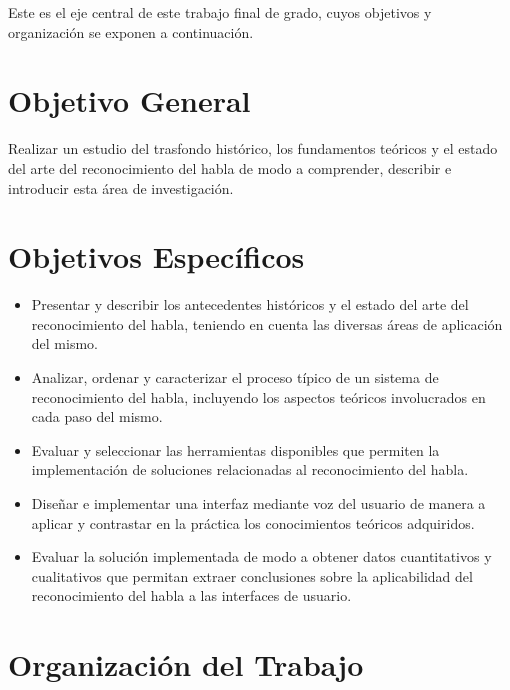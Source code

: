 Este es el eje central de este trabajo final de grado, cuyos objetivos y organizaci\'on se
exponen a continuaci\'on.

\section{Objetivo General}
\label{sec:objgral}

Realizar un estudio del trasfondo hist\'{o}rico, los fundamentos te\'{o}ricos 
y el estado del arte del reconocimiento del habla de modo a comprender, describir 
e introducir esta \'{a}rea de investigaci\'{o}n.  


\section{Objetivos Espec\'{i}ficos}
\label{sec:objspec}

\begin{itemize}
	\item Presentar y describir los antecedentes hist\'oricos y el estado del arte del reconocimiento
	del habla, teniendo en cuenta las diversas \'areas de aplicaci\'on del mismo.

    \item Analizar, ordenar y caracterizar el proceso t\'{i}pico de un sistema de reconocimiento del habla, 
        incluyendo los aspectos te\'{o}ricos involucrados en cada paso del mismo.

    \item Evaluar y seleccionar las herramientas disponibles que permiten la implementaci\'{o}n 
    de soluciones relacionadas al reconocimiento del habla.
    
    \item Dise\~{n}ar e implementar una interfaz mediante voz del usuario de manera a aplicar y 
    contrastar en la pr\'{a}ctica los conocimientos te\'{o}ricos adquiridos.
    
    \item Evaluar la soluci\'{o}n implementada de modo a obtener datos cuantitativos y cualitativos que 
        permitan extraer conclusiones sobre la aplicabilidad del reconocimiento del habla a las interfaces 
        de usuario.
\end{itemize}

\section{Organizaci\'on del Trabajo}
\label{sec:organizacion}


